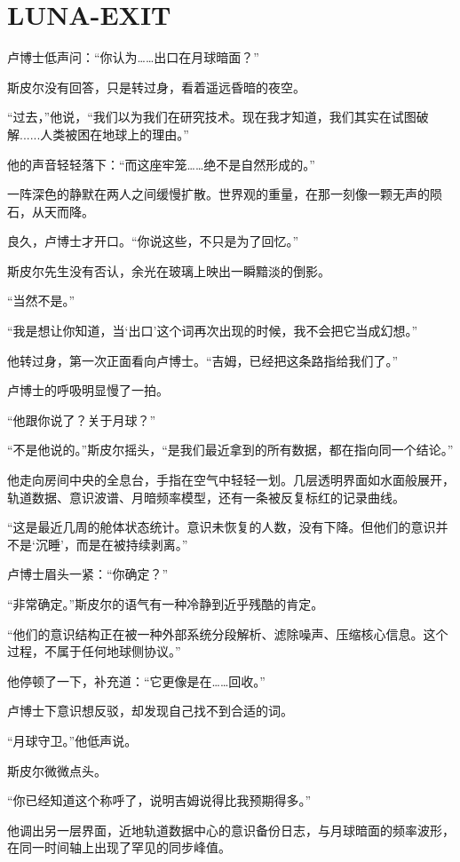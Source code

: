 \chapter{LUNA-EXIT}

卢博士低声问：“你认为……出口在月球暗面？”

斯皮尔没有回答，只是转过身，看着遥远昏暗的夜空。

“过去，”他说，“我们以为我们在研究技术。现在我才知道，我们其实在试图破解......人类被困在地球上的理由。”

他的声音轻轻落下：“而这座牢笼……绝不是自然形成的。”

一阵深色的静默在两人之间缓慢扩散。世界观的重量，在那一刻像一颗无声的陨石，从天而降。

良久，卢博士才开口。“你说这些，不只是为了回忆。”

斯皮尔先生没有否认，余光在玻璃上映出一瞬黯淡的倒影。

“当然不是。”

“我是想让你知道，当‘出口’这个词再次出现的时候，我不会把它当成幻想。”

他转过身，第一次正面看向卢博士。“吉姆，已经把这条路指给我们了。”

卢博士的呼吸明显慢了一拍。

“他跟你说了？关于月球？”

“不是他说的。”斯皮尔摇头，“是我们最近拿到的所有数据，都在指向同一个结论。”

他走向房间中央的全息台，手指在空气中轻轻一划。几层透明界面如水面般展开，轨道数据、意识波谱、月暗频率模型，还有一条被反复标红的记录曲线。

“这是最近几周的舱体状态统计。意识未恢复的人数，没有下降。但他们的意识并不是‘沉睡’，而是在被持续剥离。”

卢博士眉头一紧：“你确定？”

“非常确定。”斯皮尔的语气有一种冷静到近乎残酷的肯定。

“他们的意识结构正在被一种外部系统分段解析、滤除噪声、压缩核心信息。这个过程，不属于任何地球侧协议。”

他停顿了一下，补充道：“它更像是在……回收。”

卢博士下意识想反驳，却发现自己找不到合适的词。

“月球守卫。”他低声说。

斯皮尔微微点头。

“你已经知道这个称呼了，说明吉姆说得比我预期得多。”

他调出另一层界面，近地轨道数据中心的意识备份日志，与月球暗面的频率波形，在同一时间轴上出现了罕见的同步峰值。

